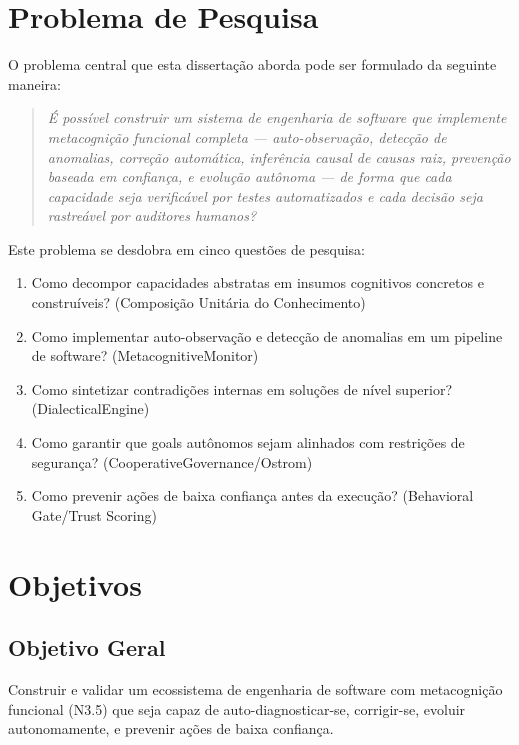 \documentclass[12pt,a4paper,oneside]{abntex2}
\begin{document}
\section{Problema de Pesquisa}

O problema central que esta dissertação aborda pode ser formulado da seguinte maneira:

\begin{quote}
\textit{É possível construir um sistema de engenharia de software que implemente metacognição funcional completa — auto-observação, detecção de anomalias, correção automática, inferência causal de causas raiz, prevenção baseada em confiança, e evolução autônoma — de forma que cada capacidade seja verificável por testes automatizados e cada decisão seja rastreável por auditores humanos?}
\end{quote}

Este problema se desdobra em cinco questões de pesquisa:

\begin{enumerate}[label=QP\arabic*:]
    \item Como decompor capacidades abstratas em insumos cognitivos concretos e construíveis? (Composição Unitária do Conhecimento)
    \item Como implementar auto-observação e detecção de anomalias em um pipeline de software? (MetacognitiveMonitor)
    \item Como sintetizar contradições internas em soluções de nível superior? (DialecticalEngine)
    \item Como garantir que goals autônomos sejam alinhados com restrições de segurança? (CooperativeGovernance/Ostrom)
    \item Como prevenir ações de baixa confiança antes da execução? (Behavioral Gate/Trust Scoring)
\end{enumerate}

\section{Objetivos}

\subsection{Objetivo Geral}

Construir e validar um ecossistema de engenharia de software com metacognição funcional (N3.5) que seja capaz de auto-diagnosticar-se, corrigir-se, evoluir autonomamente, e prevenir ações de baixa confiança.
\end{document}
